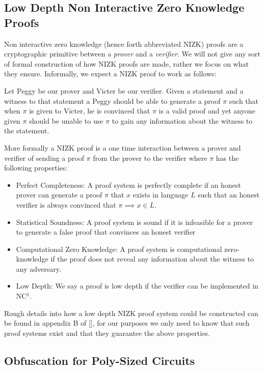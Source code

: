 \documentclass[12pt,twoside]{reedthesis}
\begin{document}
       \subsection{Low Depth Non Interactive Zero Knowledge Proofs}
       
       Non interactive zero knowledge (hence forth abbreviated NIZK) proofs are a cryptographic primitive between a \textit{prover} and a \textit{verifier}. We will not give any sort of formal construction of how NIZK proofs are made, rather we focus on what they ensure. Informally, we expect a NIZK proof to work as follows:
       \par Let Peggy be our prover and Victer be our verifier. Given a statement and a witness to that statement a Peggy should be able to generate a proof $\pi$ such that when $\pi$ is given to Victer, he is convinced that $\pi$ is a valid proof and yet anyone given $\pi$ should be unable to use $\pi$ to gain any information about the witness to the statement.
       \par More formally a NIZK proof is a one time interaction between a prover and verifier of sending a proof $\pi$ from the prover to the verifier where $\pi$ has the following properties:
       \begin{itemize}
       \item Perfect Completeness: A proof system is perfectly complete if an honest prover can generate a proof $\pi$ that $x$ exists in language $L$ such that an honest verifier is always convinced that $\pi \implies x\in L$.
       \item Statistical Soundness: A proof system is sound if it is infeasible for a prover to generate a false proof that convinces an honest verifier
       \item Computational Zero Knowledge: A proof system is computational zero-knowledge if the proof does not reveal any information about the witness to any adversary.
       \item Low Depth: We say a proof is low depth if the verifier can be implemented in NC$^1$.
         \end{itemize}
    
    
    \par Rough details into how a low depth NIZK proof system could be constructed can be found in appendix B of [\cite{Garg:2013}], for our purposes we only need to know that such proof systems exist and that they guarantee the above properties.
    
    \subsection{Obfuscation for Poly-Sized Circuits}
    
\end{document}
